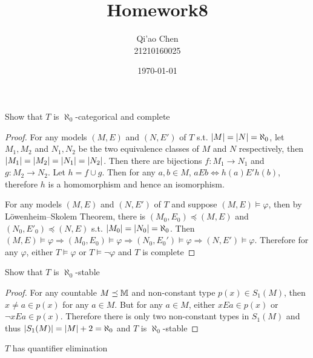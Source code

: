 \documentclass[11pt]{article}
\author{Qi'ao Chen\\21210160025}
\date{\today}
\title{Homework8}
\begin{document}
\maketitle
\begin{exercise}
Show that \(T\) is \(\aleph_0\)-categorical and complete
\end{exercise}

\begin{proof}
For any models \((M,E)\) and \((N,E')\) of \(T\) s.t. \(\abs{M}=\abs{N}=\aleph_0\), let \(M_1,M_2\) and \(N_1,N_2\) be
the two equivalence classes of \(M\) and \(N\) respectively,
then \(\abs{M_1}=\abs{M_2}=\abs{N_1}=\abs{N_2}\). Then there are bijections \(f:M_1\to N_1\)
and \(g:M_2\to N_2\). Let \(h=f\cup g\). Then for any \(a,b\in M\), \(aEb\Leftrightarrow h(a)E'h(b)\), therefore \(h\) is a
homomorphism and hence an isomorphism.

For any models \((M,E)\) and \((N,E')\) of \(T\) and suppose \((M,E)\vDash\varphi\), then by Löwenheim–Skolem
Theorem, there is \((M_0,E_0)\preceq(M,E)\) and \((N_0,E'_0)\preceq(N,E)\) s.t. \(\abs{M_0}=\abs{N_0}=\aleph_0\).
Then \((M,E)\vDash\varphi\Rightarrow(M_0,E_0)\vDash\varphi\Rightarrow(N_0,E_0')\vDash\varphi\Rightarrow(N,E')\vDash\varphi\). Therefore for any \(\varphi\), either \(T\vDash\varphi\) or \(T\vDash\neg\varphi\)
and \(T\) is complete
\end{proof}

\begin{exercise}
Show that \(T\) is \(\aleph_0\)-stable
\end{exercise}

\begin{proof}
For any countable \(M\preceq\mathbb{M}\) and non-constant type \(p(x)\in S_1(M)\), then \(x\neq a\in p(x)\) for
any \(a\in M\). But for any \(a\in M\), either \(xEa\in p(x)\) or \(\neg xEa\in p(x)\). Therefore there is only
two non-constant types in \(S_1(M)\) and thus \(\abs{S_1(M)}=\abs{M}+2=\aleph_0\) and \(T\) is \(\aleph_0\)-stable
\end{proof}

\begin{lemma}[]
\(T\) has quantifier elimination
\end{lemma}
\end{document}
